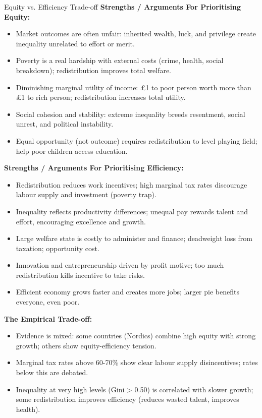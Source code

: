\documentclass[11pt, a4paper, twoside]{book}
\begin{document}
\begin{evaluation}{Equity vs. Efficiency Trade-off}
\textbf{Strengths / Arguments For Prioritising Equity:}
\begin{itemize}[leftmargin=*, nosep]
\item Market outcomes are often unfair: inherited wealth, luck, and privilege create inequality unrelated to effort or merit.
\item Poverty is a real hardship with external costs (crime, health, social breakdown); redistribution improves total welfare.
\item Diminishing marginal utility of income: £1 to poor person worth more than £1 to rich person; redistribution increases total utility.
\item Social cohesion and stability: extreme inequality breeds resentment, social unrest, and political instability.
\item Equal opportunity (not outcome) requires redistribution to level playing field; help poor children access education.
\end{itemize}
\textbf{Strengths / Arguments For Prioritising Efficiency:}
\begin{itemize}[leftmargin=*, nosep]
\item Redistribution reduces work incentives; high marginal tax rates discourage labour supply and investment (poverty trap).
\item Inequality reflects productivity differences; unequal pay rewards talent and effort, encouraging excellence and growth.
\item Large welfare state is costly to administer and finance; deadweight loss from taxation; opportunity cost.
\item Innovation and entrepreneurship driven by profit motive; too much redistribution kills incentive to take risks.
\item Efficient economy grows faster and creates more jobs; larger pie benefits everyone, even poor.
\end{itemize}
\textbf{The Empirical Trade-off:}
\begin{itemize}[leftmargin=*, nosep]
\item Evidence is mixed: some countries (Nordics) combine high equity with strong growth; others show equity-efficiency tension.
\item Marginal tax rates above 60-70\% show clear labour supply disincentives; rates below this are debated.
\item Inequality at very high levels (Gini > 0.50) is correlated with slower growth; some redistribution improves efficiency (reduces wasted talent, improves health).

\end{itemize}
\end{evaluation}
\end{document}
